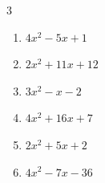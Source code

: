 \begin{multicols}{3}
\begin{enumerate}
        \phantom{$=(6x+1)(5x-1)$}

  \item $4x^{2}-5x+1$

        \phantom{$=(4x-1)(x-1)$}

  \item $2x^{2}+11x+12$

        \phantom{$=(2x+3)(x+4)$}

  \item $3x^{2}-x-2$

        \phantom{$=(x-1)(3x+2)$}

  \item $4x^{2}+16x+7$

        \phantom{$=(2x+7)(2x+1)$}

  \item $2x^{2}+5x+2$

        \phantom{$=(x+2)(2x+1)$}

  \item $4x^{2}-7x-36$

        \phantom{$=(x-4)(4x+9)$}

\end{enumerate}
\end{multicols}

\newpage
\resetdrill

